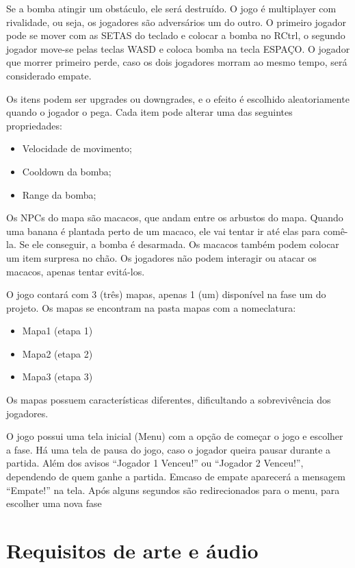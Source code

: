 \documentclass[12pt]{article}
\begin{document}
	Se a bomba atingir um obstáculo, ele será destruído. 
	O jogo é multiplayer com rivalidade, ou seja, os jogadores
	são adversários um do outro. O primeiro jogador pode 
	se mover com as SETAS do teclado e colocar a bomba 
	no RCtrl, o segundo jogador move-se pelas teclas WASD 
	e coloca bomba na tecla ESPAÇO. O jogador que morrer 
	primeiro perde, caso os dois jogadores morram ao mesmo 
	tempo, será considerado empate.

	Os itens podem ser upgrades ou downgrades, e o efeito
	é escolhido aleatoriamente quando o jogador o pega.
	Cada item pode alterar uma das seguintes propriedades:
	\begin{itemize}
	\item Velocidade de movimento;
	\item Cooldown da bomba;
	\item Range da bomba;
	\end{itemize}

	Os NPCs do mapa são macacos, que andam entre os arbustos
	do mapa. Quando uma banana é plantada perto de um macaco,
	ele vai tentar ir até elas para comê-la. Se ele conseguir, 
	a bomba é desarmada. Os macacos também podem colocar um
	item surpresa no chão. Os jogadores não podem interagir
	 ou atacar os macacos, apenas tentar evitá-los.

	O jogo contará com 3 (três) mapas, apenas 1 (um)
	disponível na fase um do projeto.  Os mapas se
	encontram na pasta mapas com a nomeclatura:

	\begin{itemize}
		\item Mapa1 (etapa 1)
		\item Mapa2 (etapa 2)
		\item Mapa3 (etapa 3)
	\end{itemize}

	Os mapas possuem características diferentes,
	dificultando a sobrevivência dos jogadores.

	O jogo possui uma tela inicial (Menu) com a opção de
	começar o jogo e escolher a fase. Há uma tela de pausa
	do jogo, caso o jogador queira pausar durante a partida.
	Além dos avisos “Jogador 1 Venceu!” ou “Jogador 2
	Venceu!”, dependendo de quem ganhe a partida. Emcaso de
	empate aparecerá a mensagem “Empate!” na tela. Após
	alguns segundos são redirecionados para o menu, para
	escolher uma nova fase

\section{Requisitos de arte e áudio}
\end{document}
